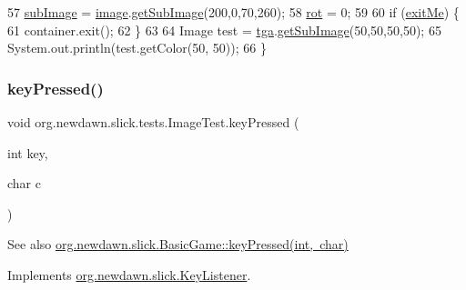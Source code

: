 \begin{DoxyCode}
57         \mbox{\hyperlink{classorg_1_1newdawn_1_1slick_1_1tests_1_1_image_test_a2900b4ce582e499edf146c02f56c24b2}{subImage}} = \mbox{\hyperlink{classorg_1_1newdawn_1_1slick_1_1tests_1_1_image_test_a6a3eac1a7e5d2b84a03f6bc68bb042de}{image}}.\mbox{\hyperlink{classorg_1_1newdawn_1_1slick_1_1_image_a2ccb3bbdda674f9efdec614a54e31e32}{getSubImage}}(200,0,70,260);
58         \mbox{\hyperlink{classorg_1_1newdawn_1_1slick_1_1tests_1_1_image_test_a6fbbcc82d7dea5cda7b3a5bbe47c1cf0}{rot}} = 0;
59         
60         \textcolor{keywordflow}{if} (\mbox{\hyperlink{classorg_1_1newdawn_1_1slick_1_1tests_1_1_image_test_ab4f8dc82794bf9949ac7efc7c1121bcc}{exitMe}}) \{
61             container.exit();
62         \}
63         
64         Image test = \mbox{\hyperlink{classorg_1_1newdawn_1_1slick_1_1tests_1_1_image_test_a7ab57bed77d7042ab2204139e041b466}{tga}}.\mbox{\hyperlink{classorg_1_1newdawn_1_1slick_1_1_image_a2ccb3bbdda674f9efdec614a54e31e32}{getSubImage}}(50,50,50,50);
65         System.out.println(test.getColor(50, 50));
66     \}
\end{DoxyCode}
\mbox{\label{classorg_1_1newdawn_1_1slick_1_1tests_1_1_image_test_aed432b3c2a19c65bcbb759d170fdade9}} 
\subsubsection{\texorpdfstring{key\+Pressed()}{keyPressed()}}
{\footnotesize\ttfamily void org.\+newdawn.\+slick.\+tests.\+Image\+Test.\+key\+Pressed (\begin{DoxyParamCaption}\item[{int}]{key,  }\item[{char}]{c }\end{DoxyParamCaption})\hspace{0.3cm}{\ttfamily [inline]}}

\begin{DoxySeeAlso}{See also}
\mbox{\hyperlink{classorg_1_1newdawn_1_1slick_1_1_basic_game_a4fbb3345b5abf5ddd54a99466d07f02f}{org.\+newdawn.\+slick.\+Basic\+Game\+::key\+Pressed(int, char)}} 
\end{DoxySeeAlso}


Implements \mbox{\hyperlink{interfaceorg_1_1newdawn_1_1slick_1_1_key_listener_ac0b0568a21ef486c4f51382614c196ef}{org.\+newdawn.\+slick.\+Key\+Listener}}.


